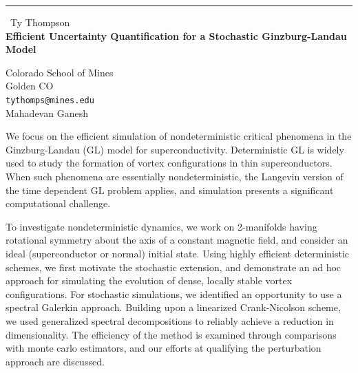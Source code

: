 \documentclass{report}
\begin{document}
\begin{center}
\rule{6in}{1pt} \
{\large Ty Thompson \\
{\bf Efficient Uncertainty Quantification for a Stochastic Ginzburg-Landau Model}}

Colorado School of Mines \\ Golden CO
\\
{\tt tythomps@mines.edu}\\
Mahadevan Ganesh\end{center}

We focus on the efficient simulation of nondeterministic critical
phenomena in the Ginzburg-Landau (GL) model for superconductivity.
Deterministic GL is widely used to study the formation of vortex
configurations
in thin superconductors. When such phenomena are essentially
nondeterministic, the Langevin version of the time dependent GL problem
applies, and simulation presents a significant computational challenge.

To investigate nondeterministic dynamics, we work on 2-manifolds having
rotational symmetry about the axis of a constant magnetic field, and
consider an ideal (superconductor or normal) initial state. Using highly
efficient deterministic schemes, we first motivate the stochastic
extension, and demonstrate an ad hoc approach for simulating the
evolution of dense, locally stable vortex configurations. For stochastic
simulations,
we identified an opportunity to use a spectral Galerkin approach.
Building upon a linearized Crank-Nicolson scheme, we used generalized
spectral decompositions to reliably achieve a reduction in
dimensionality. The
efficiency of the method is examined through comparisons with monte carlo
estimators, and our efforts at qualifying the perturbation approach are
discussed.
\end{document}
